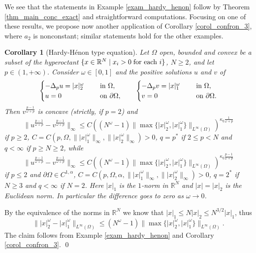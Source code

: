 \documentclass[11pt, reqno]{amsart}
\newtheorem{corollary}[lemma]{Corollary}
\theoremstyle{definition}
\numberwithin{equation}{section}
\newcommand{\R}{\mathbb{R}}
\def\norm#1{\|#1\|}
\renewenvironment{proof}[1][\proofname]{\medskip \noindent {\bfseries #1. }}{\qed \bigskip}
\begin{document}
We see that the statements in Example \ref{exam_hardy_henon} follow by Theorem \ref{thm_main_conc_exact} and straightforward computations. Focusing on one of these results, we propose now another application of Corollary \ref{corol_confron_3}, where $a_2$ is nonconstant; similar statements hold for the other examples.

\begin{corollary}[Hardy-Hénon type equation]
\label{corol_hard_hen_perturb}
Let $\Omega$ open, bounded and convex be a subset of the hyperoctant $\{ x\in \R^N \mid x_i > 0 \; \hbox{for each $i$}\}$, $N\geq 2$, and let $p\in (1,+\infty)$.
Consider $\omega \in [0,1]$ and the positive solutions $u$ and $v$ of 
$$\begin{cases}
-\Delta_p u = |x|_2^{\omega} & \quad \hbox{ in $\Omega$},\\ 
u =0 & \quad \hbox{ on $\partial \Omega$},
\end{cases}
\qquad
\begin{cases}
-\Delta_p v = |x|_1^{\omega} & \quad \hbox{ in $\Omega$},\\ 
v =0 & \quad \hbox{ on $\partial \Omega$}.
\end{cases}$$
Then $v^{\frac{p-1}{\omega+ p}}$ is concave (strictly, if $p=2$) and
$$\norm{u^{\frac{p-1}{\omega+ p}}-v^{\frac{p-1}{\omega+ p}}}_{\infty} \leq C \left((N^{\omega}-1) \norm{\max\{|x|_2^{\omega}, |x|_1^{\omega} \}}_{L^{\infty}(\Omega)}\right)
^{\kappa_{q}\frac{1}{\omega+ p}}$$
if $p\geq 2$, $C=C(p, \Omega, \norm{|x|_1^{\omega}}_{\infty},\norm{|x|_2^{\omega}}_{\infty})>0$, $q=p^*$ if $2 \leq p<N$ and $q<\infty$ if $p\geq N \geq 2$, while
$$\norm{u^{\frac{p-1}{\omega+ p}}-v^{\frac{p-1}{\omega+ p}}}_{\infty} \leq C \left((N^{\omega}-1) \norm{\max\{|x|_2^{\omega}, |x|_1^{\omega} \}}_{L^{\infty}(\Omega)}\right)
^{\kappa_{q}
\frac{p-1}{\omega+ p}}$$
if $p\leq 2$ and $\partial \Omega \in C^{1,\alpha}$, $C=C(p, \Omega, \alpha, \norm{|x|_1^{\omega}}_{\infty}, \norm{|x|_2^{\omega}}_{\infty})>0$, $q=2^*$ if $N\geq 3$ and $q <\infty$ if $N= 2$.
Here $|x|_1$ is the $1$-norm in $\R^N$ and $|x|=|x|_2$ is the Euclidean norm.
In particular the difference goes to zero as $\omega \to 0$. 
\end{corollary}

\begin{proof}
By the equivalence of the norms in $\R^N$ we know that $|x|_1 \leq N |x|_2 \leq N^{3/2} |x|_1$, thus
$$\norm{|x|_2^{\omega} - |x|_1^{\omega}}_{L^{\infty}(\Omega)} \leq (N^{\omega}-1) \norm{\max\{|x|_2^{\omega}, |x|_1^{\omega} \}}_{L^{\infty}(\Omega)}.$$
The claim follows from Example \ref{exam_hardy_henon} and Corollary \ref{corol_confron_3}.
\end{proof}
\end{document}
